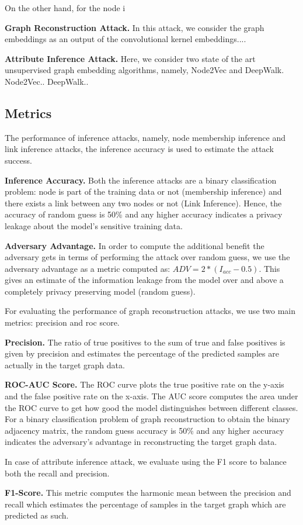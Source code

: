 On the other hand, for the node i

\noindent\textbf{Graph Reconstruction Attack.} In this attack, we consider the graph embeddings as an output of the convolutional kernel embeddings....


\noindent\textbf{Attribute Inference Attack.} Here, we consider two state of the art unsupervised graph embedding algorithms, namely, Node2Vec and DeepWalk.
Node2Vec..
DeepWalk..

\subsection{Metrics}

The performance of inference attacks, namely, node membership inference and link inference attacks, the inference accuracy is used to estimate the attack success.

\noindent\textbf{Inference Accuracy.} Both the inference attacks are a binary classification problem: node is part of the training data or not (membership inference) and there exists a link between any two nodes or not (Link Inference).
Hence, the accuracy of random guess is 50\% and any higher accuracy indicates a privacy leakage about the model's sensitive training data.

\noindent\textbf{Adversary Advantage.} In order to compute the additional benefit the adversary gets in terms of performing the attack over random guess, we use the adversary advantage as a metric computed as: $ADV = 2*(I_{acc}-0.5)$.
This gives an estimate of the information leakage from the model over and above a completely privacy preserving model (random guess).

For evaluating the performance of graph reconstruction attacks, we use two main metrics: precision and roc score.

\noindent\textbf{Precision.} The ratio of true positives to the sum of true and false positives is given by precision and estimates the percentage of the predicted samples are actually in the target graph data.

\noindent\textbf{ROC-AUC Score.} The ROC curve plots the true positive rate on the y-axis and the false positive rate on the x-axis. The AUC score computes the area under the ROC curve to get how good the model distinguishes between different classes.
For a binary classification problem of graph reconstruction to obtain the binary adjacency matrix, the random guess accuracy is 50\% and any higher accuracy indicates the adversary's advantage in reconstructing the target graph data.

In case of attribute inference attack, we evaluate using the F1 score to balance both the recall and precision.

\noindent\textbf{F1-Score.} This metric computes the harmonic mean between the precision and recall which estimates the percentage of samples in the target graph which are predicted as such.
